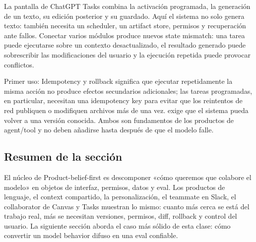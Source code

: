 La pantalla de ChatGPT Tasks combina la activación programada, la generación de un texto, su edición posterior y su guardado. Aquí el sistema no solo genera texto: también necesita un scheduler, un artifact store, permisos y recuperación ante fallos. Conectar varios módulos produce nuevos state mismatch: una tarea puede ejecutarse sobre un contexto desactualizado, el resultado generado puede sobrescribir las modificaciones del usuario y la ejecución repetida puede provocar conflictos.


\begin{knowledgebox}{Primer uso: Idempotency y rollback}
 significa que ejecutar repetidamente la misma acción no produce efectos secundarios adicionales; las tareas programadas, en particular, necesitan una idempotency key para evitar que los reintentos de red publiquen o modifiquen archivos más de una vez.  exige que el sistema pueda volver a una versión conocida. Ambos son fundamentos de los productos de agent/tool y no deben añadirse hasta después de que el modelo falle.
\end{knowledgebox}

\subsection{Resumen de la sección}

El núcleo de Product-belief-first es descomponer «cómo queremos que colabore el modelo» en objetos de interfaz, permisos, datos y eval. Los productos de lenguaje, el context compartido, la personalización, el teammate en Slack, el collaborator de Canvas y Tasks muestran lo mismo: cuanto más cerca se está del trabajo real, más se necesitan versiones, permisos, diff, rollback y control del usuario. La siguiente sección aborda el caso más sólido de esta clase: cómo convertir un model behavior difuso en una eval confiable.
